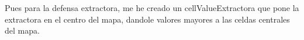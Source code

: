 Pues para la defensa extractora, me he creado un cellValueExtractora  que pone la extractora en el centro del mapa, dandole valores mayores a las celdas centrales del mapa.

